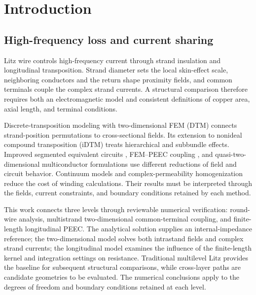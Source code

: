 \section{Introduction}
\label{chapter:01}

\hypertarget{01.introduction.heading}{}
\subsection{High-frequency loss and current sharing}

\hypertarget{01.introduction.p1}{}
Litz wire controls high-frequency current through strand insulation and longitudinal transposition. Strand diameter sets the local skin-effect scale, neighboring conductors and the return shape proximity fields, and common terminals couple the complex strand currents. A structural comparison therefore requires both an electromagnetic model and consistent definitions of copper area, axial length, and terminal conditions.

\hypertarget{01.introduction.p2}{}
Discrete-transposition modeling with two-dimensional FEM (DTM) \cite{P01} connects strand-position permutations to cross-sectional fields. Its extension to nonideal compound transposition (iDTM) \cite{N01} treats hierarchical and subbundle effects. Improved segmented equivalent circuits \cite{P02}, FEM–PEEC coupling \cite{P03}, and quasi-two-dimensional multiconductor formulations \cite{P04} use different reductions of field and circuit behavior. Continuum models \cite{P05} and complex-permeability homogenization \cite{P09} reduce the cost of winding calculations. Their results must be interpreted through the fields, current constraints, and boundary conditions retained by each method.

\hypertarget{01.introduction.p3}{}
This work connects three levels through reviewable numerical verification: round-wire analysis, multistrand two-dimensional common-terminal coupling, and finite-length longitudinal PEEC. The analytical solution supplies an internal-impedance reference; the two-dimensional model solves both intrastand fields and complex strand currents; the longitudinal model examines the influence of the finite-length kernel and integration settings on resistance. Traditional multilevel Litz provides the baseline for subsequent structural comparisons, while cross-layer paths are candidate geometries to be evaluated. The numerical conclusions apply to the degrees of freedom and boundary conditions retained at each level.

